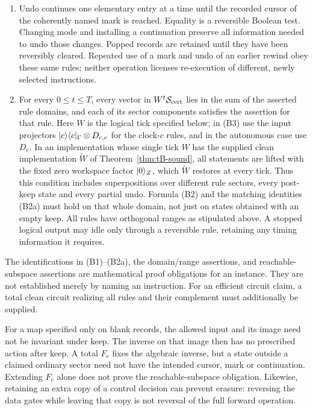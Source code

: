 \begin{definition}
\begin{enumerate}
of elementary signed entries; a compound entry is not a unit-cost gate.
\item Undo continues one elementary entry at a time until the recorded
cursor of the coherently named mark is reached. Equality is a reversible
Boolean test. Changing mode and installing a continuation preserve all
information needed to undo those changes. Popped records are retained
until they have been reversibly cleared. Repeated use of a mark and undo
of an earlier rewind obey these same rules; neither operation licenses
re-execution of different, newly selected instructions.
\item For every $0\leq t\leq T$, every vector in
$W^t\mathcal S_{\rm cert}$ lies in the sum of the asserted rule
domains, and each of its sector components satisfies the assertion for
that rule. Here $W$ is the logical tick specified below; in (B3) use
the input projectors $\lvert c\rangle\langle c\rvert_\Gamma\otimes D_{c,e}$ for the
clock-$c$ rules, and in the autonomous case use $D_e$.
In an implementation whose single tick $W$ has the supplied clean
implementation $\widetilde W$ of Theorem~\ref{thm:tB-sound}, all
statements are lifted with the fixed zero workspace factor
$\lvert 0\rangle_Z$, which $\widetilde W$ restores at every tick. Thus this condition includes superpositions over
different rule sectors, every post-keep state and every partial undo.
Formula (B2) and the matching identities (B2a) must hold
on that whole domain, not just on states obtained with an empty keep.
All rules have orthogonal ranges as stipulated above. A stopped logical
output may idle only through a reversible rule, retaining any timing
information it requires.
\end{enumerate}
The identifications in (B1)--(B2a), the domain/range assertions, and
reachable-subspace assertions are mathematical proof obligations for an
instance. They are not established merely by naming an instruction.
For an efficient circuit claim, a total clean circuit realizing all
rules and their complement must additionally be supplied.
\end{definition}

\begin{remark}\label{rem:tB-range}
For a map specified only on blank records, the allowed input and its
image need not be invariant under keep. The inverse on that image then
has no prescribed action after keep. A total $F_e$ fixes the algebraic
inverse, but a state outside a claimed ordinary sector need not have the
intended cursor, mark or continuation. Extending $F_e$ alone does not
prove the reachable-subspace obligation. Likewise, retaining an extra
copy of a control decision can prevent erasure: reversing the data gates
while leaving that copy is not reversal of the full forward operation.
\end{remark}

